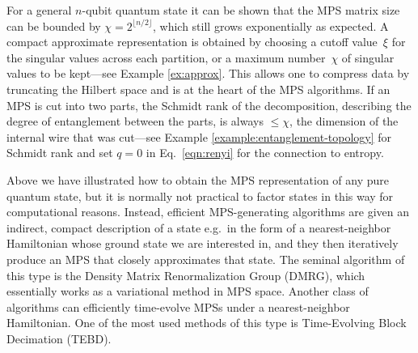 \documentclass[aps,pra,12pt,nofootinbib,superscriptaddress,longbibliography]{revtex4-1}
\theoremstyle{plain}
\theoremstyle{definition}
\begin{document}
For a general $n$-qubit quantum state it can be shown that the MPS matrix size
can be bounded by $\chi = 2^{\lfloor n/2\rfloor}$, which still grows exponentially
as expected.
A compact approximate representation is obtained by choosing a cutoff
value~$\xi$ for the singular values across each partition, or a maximum
number~$\chi$ of singular values to be kept---see Example \ref{ex:approx}.  This allows one to compress data
by truncating the Hilbert space and is at the heart of the MPS algorithms.
If an MPS is cut into two parts, the Schmidt rank of the decomposition, describing the degree of entanglement between the parts,
is always $\le \chi$, the dimension of the internal wire that was cut---see Example \ref{example:entanglement-topology} for Schmidt rank and set $q=0$ in Eq.~\eqref{eqn:renyi} for the connection to entropy.

Above we have illustrated how to obtain the MPS representation of any pure quantum state,
but it is normally not practical to factor states in this way for computational reasons.
Instead, efficient MPS-generating algorithms are given an indirect, compact description of a state e.g.~in the form of a nearest-neighbor Hamiltonian whose ground state we are interested in, and
they then iteratively produce an MPS that closely approximates that state.
The seminal algorithm of this type is the Density Matrix Renormalization Group (DMRG),
which essentially works as a variational method in MPS space.
Another class of algorithms can efficiently time-evolve MPSs under
a nearest-neighbor Hamiltonian.
One of the most used methods of this type is Time-Evolving Block Decimation (TEBD).
\end{document}
